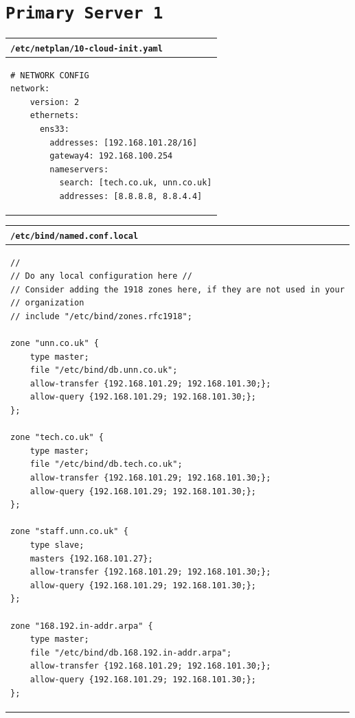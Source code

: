 \documentclass[11pt]{article}
\begin{document}
\section{\texttt{Primary Server 1}}
\begin{table}[ht]
    \begin{tabular}{|p{17.7cm}|} 
        \hline
        \texttt{\textbf{/etc/netplan/10-cloud-init.yaml}}\\ 
        \hline
        \lstset{
                basicstyle=\scriptsize\ttfamily,
              }
              \begin{lstlisting}
# NETWORK CONFIG
network:
    version: 2
    ethernets:
      ens33:
        addresses: [192.168.101.28/16]
        gateway4: 192.168.100.254
        nameservers:
          search: [tech.co.uk, unn.co.uk]
          addresses: [8.8.8.8, 8.8.4.4]
        \end{lstlisting}\\
        \hline
    \end{tabular}
\end{table}

\begin{table}[ht]
    \begin{tabular}{|p{17.7cm}|} 
        \hline
        \texttt{\textbf{/etc/bind/named.conf.local}}\\ 
        \hline
        \lstset{
                basicstyle=\scriptsize\ttfamily,
              }
              \begin{lstlisting}
// 
// Do any local configuration here //
// Consider adding the 1918 zones here, if they are not used in your
// organization
// include "/etc/bind/zones.rfc1918";
                
zone "unn.co.uk" {
    type master;
    file "/etc/bind/db.unn.co.uk";
    allow-transfer {192.168.101.29; 192.168.101.30;};
    allow-query {192.168.101.29; 192.168.101.30;};
};
                
zone "tech.co.uk" {
    type master;
    file "/etc/bind/db.tech.co.uk";
    allow-transfer {192.168.101.29; 192.168.101.30;};
    allow-query {192.168.101.29; 192.168.101.30;};
};
                
zone "staff.unn.co.uk" {
    type slave;
    masters {192.168.101.27};
    allow-transfer {192.168.101.29; 192.168.101.30;};
    allow-query {192.168.101.29; 192.168.101.30;};
};
                
zone "168.192.in-addr.arpa" {
    type master;
    file "/etc/bind/db.168.192.in-addr.arpa";
    allow-transfer {192.168.101.29; 192.168.101.30;};
    allow-query {192.168.101.29; 192.168.101.30;};
};
        \end{lstlisting}\\
        \hline
    \end{tabular}
\end{table}
\end{document}

